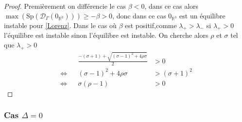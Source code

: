 \documentclass{article}
\newcommand{\R}{\mathbb{R}}
\newtheorem[M , nocut]{prop}{Proposition}[section]
\newtheorem[S , nocut]{definition}{Définition}
\newtheorem[S , nocut]{lemme}{Lemme}
\newtheorem[L , nocut]{thm}{Théoreme}
\newtheorem[L , nocut]{cor}{Corollaire}
\begin{document}
\begin{proof}
    Premièrement on différencie le cas $\beta<0$, dans ce cas alors $\max(\mathrm{Sp}(\mathcal{D}_\Gamma (0_{\R^3})))\ge -\beta > 0$, donc dans ce cas $0_{\R^3}$ est un équilibre instable pour \eqref{Lorenz}. Dans le cas où $\beta$ est positif,comme $\lambda_+>\lambda_-$ si $\lambda_+ > 0$ l'équilibre est instable sinon l'équilibre est instable. On cherche alors $\rho$ et $\sigma$ tel que $\lambda_+>0$
    \begin{align*}
        && \frac{-(\sigma+1) + \sqrt{(\sigma-1)^2+4\rho\sigma}}{2} &>0 \\
        \Leftrightarrow && (\sigma-1)^2+4\rho\sigma &> (\sigma+1)^2 \\
        \Leftrightarrow && \sigma(\rho-1) &> 0
    \end{align*}
\end{proof}


\subsubsection*{Cas $\Delta = 0$}
\end{document}
